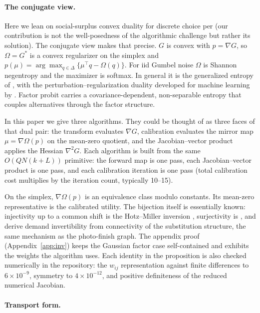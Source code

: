 \documentclass[12pt]{article}
\theoremstyle{remark}
\begin{document}
\paragraph{The conjugate view.} Here we lean on social-surplus convex duality for discrete choice per 
\citep{chiong2016,norets2013} (our contribution is not the well-posedness of the
algorithmic challenge but rather its solution). The conjugate view makes that precise. $G$ is
convex with $p = \nabla G$, so $\Omega = G^*$ is a convex regularizer on
the simplex and $p(\mu) = \arg\max_{q \in \Delta}\{\mu^\top q -
\Omega(q)\}$. For iid Gumbel noise $\Omega$ is Shannon negentropy and
the maximizer is softmax. In general it is the generalized entropy of
\citet{fosgerau2020}, with the perturbation--regularization duality
developed for machine learning by \citet{berthet2020}. Factor probit
carries a covariance-dependent, non-separable entropy that couples
alternatives through the factor structure. 

In this paper we give three
algorithms. They could be thought of as three faces of that dual pair: the transform
evaluates $\nabla G$, calibration evaluates the mirror map $\mu =
\nabla\Omega(p)$ on the mean-zero quotient, and the Jacobian--vector
product applies the Hessian $\nabla^2 G$. Each algorithm is built from the same
$O(QN(k+L))$ primitive: the forward map is one pass, each
Jacobian--vector product is one pass, and each calibration iteration is
one pass (total calibration cost multiplies by the iteration count,
typically 10--15). 

On the simplex, $\nabla\Omega(p)$ is an equivalence
class modulo constants. Its mean-zero representative is the calibrated
utility. The bijection itself is essentially known:
injectivity up to a common shift is the Hotz--Miller inversion
\citep{hotz1993}, surjectivity is \citet{norets2013}, and
\citet{bgh2013} derive demand invertibility from
connectivity of the substitution structure, the same mechanism as the
photo-finish graph. The appendix proof (Appendix~\ref{app:inv}) keeps the
Gaussian factor case self-contained and exhibits the weights the algorithm uses. Each
identity in the proposition is also checked
numerically in the repository: the $w_{ij}$ representation against finite
differences to $6\times10^{-9}$, symmetry to $4\times10^{-12}$, and
positive definiteness of the reduced numerical Jacobian.


\paragraph{Transport form.}
\end{document}

